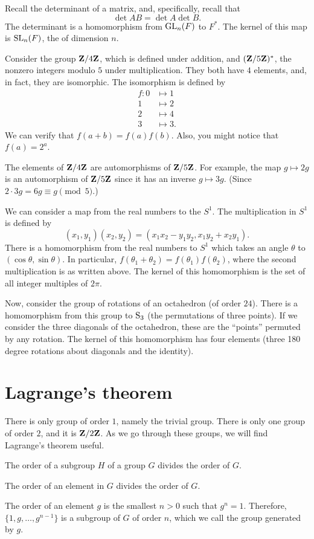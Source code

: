 \documentclass[11pt, oneside]{amsart}
\begin{document}
Recall the determinant of a matrix, and, specifically, recall that
$$
\det AB = \det A \det B. 
$$
The determinant is a homomorphism from $\operatorname{GL}_n(F)$ to $F^*$. The kernel of this map is $\operatorname{SL}_n(F)$, the  of dimension $n$.

Consider the group $\mathbf Z/4\mathbf Z$, which is defined under addition, and $(\mathbf Z/5\mathbf Z)^*$, the nonzero integers modulo $5$ under multiplication. They both have $4$ elements, and, in fact, they are isomorphic. The isomorphism is defined by
\begin{align*}
f: 0 &\mapsto 1\\
1&\mapsto 2\\
2&\mapsto 4\\
3&\mapsto 3.
\end{align*}
We can verify that $f(a+b) = f(a)f(b)$. Also, you might notice that $f(a) = 2^a$.

The elements of $\mathbf Z/4\mathbf Z$ are automorphisms of $\mathbf Z/5\mathbf Z$. For example, the map $g\mapsto 2g$ is an automorphism of $\mathbf Z/5\mathbf Z$ since it has an inverse $g\mapsto 3g$. (Since $2\cdot 3g = 6g \equiv g \pmod 5$.)

We can consider a map from the real numbers to the  $S^1$. The multiplication in $S^1$ is defined by 
$$
(x_1,y_1)(x_2,y_2) = (x_1x_2 - y_1y_2, x_1y_2 + x_2y_1).
$$
There is a homomorphism from the real numbers to $S^1$ which takes an angle $\theta$ to $(\cos \theta, \sin \theta)$. In particular, $f(\theta_1 + \theta_2) = f(\theta_1) f(\theta_2)$, where the second multiplication is as written above. The kernel of this homomorphism is the set of all integer multiples of $2\pi$.

Now, consider the group of rotations of an octahedron (of order $24$). There is a homomorphism from this group to $\operatorname{S}_3$ (the permutations of three points). If we consider the three diagonals of the octahedron, these are the ``points'' permuted by any rotation. The kernel of this homomorphism has four elements (three 180 degree rotations about diagonals and the identity).

\section{Lagrange's theorem}
There is only group of order $1$, namely the trivial group. There is only one group of order $2$, and it is $\mathbf Z/2\mathbf Z$. As we go through these groups, we will find Lagrange's theorem useful.
\begin{theorem}
[Lagrange]\label{lagrange} The order of a subgroup $H$ of a group $G$ divides the order of $G$. 
\end{theorem}
\begin{corollary}
The order of an element in $G$ divides the order of $G$.
\end{corollary}
The order of an element $g$ is the smallest $n> 0$ such that $g^n = 1$. Therefore, $\{1,g, \hdots, g^{n-1}\}$ is a subgroup of $G$ of order $n$, which we call the group generated by $g$.
\end{document}
